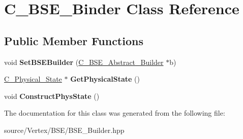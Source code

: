 \hypertarget{class_c___b_s_e___binder}{\section{C\-\_\-\-B\-S\-E\-\_\-\-Binder Class Reference}
\label{class_c___b_s_e___binder}
}
\subsection*{Public Member Functions}
\begin{DoxyCompactItemize}
\item 
\hypertarget{class_c___b_s_e___binder_a63c48a6bbd215b094516082a4d58abee}{void {\bfseries Set\-B\-S\-E\-Builder} (\hyperlink{class_c___b_s_e___abstract___builder}{C\-\_\-\-B\-S\-E\-\_\-\-Abstract\-\_\-\-Builder} $\ast$b)}\label{class_c___b_s_e___binder_a63c48a6bbd215b094516082a4d58abee}

\item 
\hypertarget{class_c___b_s_e___binder_adbc4866aa3784e0109321721a9b68d53}{\hyperlink{class_c___physical___state}{C\-\_\-\-Physical\-\_\-\-State} $\ast$ {\bfseries Get\-Physical\-State} ()}\label{class_c___b_s_e___binder_adbc4866aa3784e0109321721a9b68d53}

\item 
\hypertarget{class_c___b_s_e___binder_a098ad5121c3349dfb908653fc82249ef}{void {\bfseries Construct\-Phys\-State} ()}\label{class_c___b_s_e___binder_a098ad5121c3349dfb908653fc82249ef}

\end{DoxyCompactItemize}


The documentation for this class was generated from the following file\-:\begin{DoxyCompactItemize}
\item 
source/\-Vertex/\-B\-S\-E/B\-S\-E\-\_\-\-Builder.\-hpp\end{DoxyCompactItemize}
